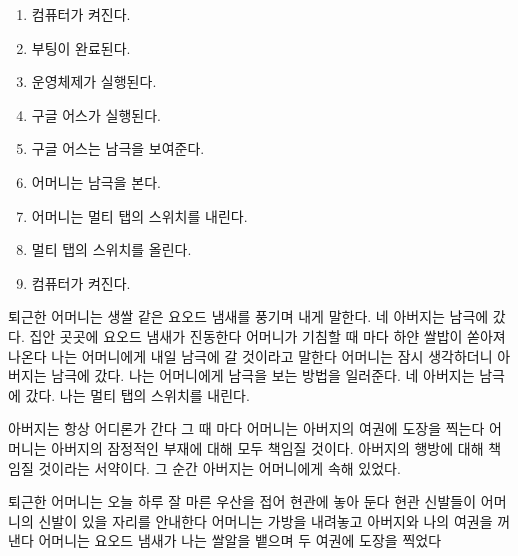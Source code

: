\begin{enumerate}

\def\labelenumi{\arabic{enumi}.}

\tightlist

\item

  컴퓨터가 켜진다.

\item

  부팅이 완료된다.

\item

  운영체제가 실행된다.

\item

  구글 어스가 실행된다.

\item

  구글 어스는 남극을 보여준다.

\item

  어머니는 남극을 본다.

\item

  어머니는 멀티 탭의 스위치를 내린다.

\item

  멀티 탭의 스위치를 올린다.

\item

  컴퓨터가 켜진다.

\end{enumerate}



퇴근한 어머니는 생쌀 같은 요오드 냄새를 풍기며 내게 말한다. 네 아버지는 남극에 갔다. 집안 곳곳에 요오드 냄새가 진동한다 어머니가 기침할 때 마다 하얀 쌀밥이 쏟아져 나온다 나는 어머니에게 내일 남극에 갈 것이라고 말한다 어머니는 잠시 생각하더니 아버지는 남극에 갔다. 나는 어머니에게 남극을 보는 방법을 일러준다. 네 아버지는 남극에 갔다. 나는 멀티 탭의 스위치를 내린다.



아버지는 항상 어디론가 간다 그 때 마다 어머니는 아버지의 여권에 도장을 찍는다 어머니는 아버지의 잠정적인 부재에 대해 모두 책임질 것이다. 아버지의 행방에 대해 책임질 것이라는 서약이다. 그 순간 아버지는 어머니에게 속해 있었다.



퇴근한 어머니는 오늘 하루 잘 마른 우산을 접어 현관에 놓아 둔다 현관 신발들이 어머니의 신발이 있을 자리를 안내한다 어머니는 가방을 내려놓고 아버지와 나의 여권을 꺼낸다 어머니는 요오드 냄새가 나는 쌀알을 뱉으며 두 여권에 도장을 찍었다



